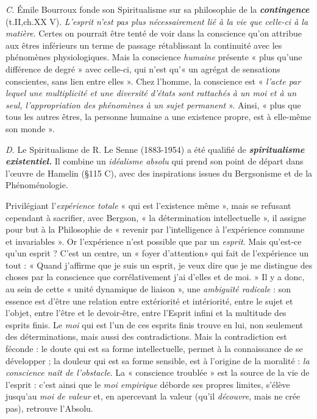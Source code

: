 {\it C.} Émile Bourroux fonde son Spiritualisme sur sa philosophie
de la \textbf{\textit {contingence}} (t.II,ch.XX V). {\it L'esprit n'est pas plus nécessairement
lié à la vie que celle-ci à la matière}. Certes on pourrait être
tenté de voir dans la conscience
qu’on attribue aux êtres inférieurs un terme de passage rétablissant
la continuité avec les phénomènes physiologiques. Mais la conscience
{\it humaine} présente « plus qu’une différence de degré » avec celle-ci, qui
n’est qu’« un agrégat de sensations conscientes, sans lien entre elles ».
Chez l’homme, la conscience est « {\it l'acte par lequel une multiplicité
et une diversité d'états sont rattachés à un moi et à un seul, l’appropriation
des phénomènes à un sujet permanent} ». Ainsi, « plus que tous
les autres êtres, la personne humaine a une existence propre, est à
elle-même son monde ».

{\it D.} Le Spiritualisme de R. Le Senne (1883-1954) a été qualifié de
\textbf{\textit {spiritualisme existentiel.}} Il combine un {\it idéalisme absolu} qui prend son
point de départ dans l’œuvre de Hamelin (\S 115 C), avec des inspirations
issues du Bergsonisme et de la Phénoménologie.

\vspace{0.24cm}
{\footnotesize 
Privilégiant l'{\it expérience totale} « qui est l'existence même », mais se refusant
cependant à sacrifier, avec Bergson, « la détermination intellectuelle »,
il assigne pour but à la Philosophie de « revenir par l'intelligence à l’expérience
commune et invariables ». Or l'expérience n’est possible que par un
{\it esprit}. Mais qu'est-ce qu’un esprit ? C'est un centre, un « foyer d'attention»
qui fait de l’expérience un tout : « Quand j’affirme que je suis un esprit,
je veux dire que je me distingue des choses par la conscience que corrélativement
j'ai d'elles et de moi. » Il y a donc, au sein de cette « unité
dynamique de liaison », une {\it ambiguïté radicale} : son essence est d’être une
relation entre extériorité et intériorité, entre le sujet et l’objet, entre l’être
et le devoir-être, entre l'Esprit infini et la multitude des esprits finis. Le {\it moi}
qui est l’un de ces esprits finis trouve en lui, non seulement des déterminations,
mais aussi des contradictions. Mais la contradiction est féconde : le
doute qui est sa forme intellectuelle, permet à la connaissance de se développer ;
la douleur qui est sa forme sensible, est à l’origine de la moralité :
{\it la conscience naît de l'obstacle}. La « conscience troublée » est la source de la
vie de l'esprit : c'est ainsi que le {\it moi empirique} déborde ses propres limites,
s'élève jusqu’au {\it moi de valeur} et, en apercevant la valeur (qu’il {\it découvre},
mais ne crée pas), retrouve l’Absolu.}
\vspace{0.31cm}


